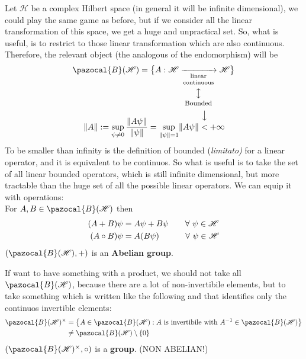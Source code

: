 \documentclass[../main.tex]{subfiles}
\begin{document}
\begin{example}
Let $\mathcal{H}$ be a complex Hilbert space (in general it will be infinite dimensional), we could play the same game as before, but if we consider all the linear transformation of this space, we get a huge and unpractical set. So, what is useful, is to restrict to those linear transformation which are also continuous. Therefore, the relevant object (the analogous of the endomorphism) will be
\[
\begin{split}
\pazocal{B}(\mathcal{H})=\big\{A:\mathcal{H}&\xrightarrow[\underset{\mathclap{\tikz \node {$\big\updownarrow$} node [below=1.25ex] {\footnotesize Bounded };}}{\text{\parbox{1.3 cm}{\centering linear \\[-4pt]  continuous}}}]{}\mathcal{H}\big\}\\[-2.5mm]
\norm{A}:=\sup_{\psi\neq 0}\frac{\norm{A\psi}}{\norm{\psi}}=\sup_{\norm{\psi}=1}&\norm{A\psi}\overset{\mathclap{\tikz \node {$\big\downarrow$} node [above=0ex] {\footnotesize};}}{<}+\infty
\end{split}
\]
To be smaller than infinity is the definition of bounded (\textit{limitato) }for a linear operator, and it is equivalent to be continuos. So what is useful is to take the set of all linear bounded operators, which is still infinite dimensional, but more tractable than the huge set of all the possible linear operators. We can equip it with operations:\\
For $A,B\in \pazocal{B}(\mathcal{H})$ then
\[
\begin{split}
\pqty{A+B}\psi&=A\psi+B\psi \quad  \quad \forall \ \psi\in \mathcal{H}\\
\pqty{A\circ B}\psi&=A\pqty{B\psi}\qquad  \,\quad \forall \ \psi\in \mathcal{H}
\end{split}
\]
$\pqty{\pazocal{B}(\mathcal{H}),+}$ is an \textbf{Abelian group}.
\end{example}
\begin{example}
If want to have something with a product, we should not take all $\pazocal{B}(\mathcal{H})$, because there are a lot of non-invertibile elements, but to take something which is written like the following and that identifies only the continuos invertible elements:
\[
\begin{split}
\pazocal{B}(\mathcal{H})^\times &= \Bqty{A\in\pazocal{B}(\mathcal{H}): A \ \textrm{is invertibile with} \ A^{-1}\in\pazocal{B}(\mathcal{H})}\\
&\neq \pazocal{B}(\mathcal{H}) \setminus \Bqty{0}
\end{split}
\]
$\pqty{\pazocal{B}(\mathcal{H})^\times,\circ}$ is a \textbf{group}. (NON ABELIAN!)
\end{example}
\end{document}
